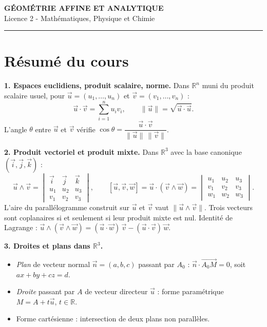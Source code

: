 \documentclass[12pt,a4paper]{article}
\begin{document}
\fi

\begin{center}
  {\LARGE\bfseries GÉOMÉTRIE AFFINE ET ANALYTIQUE}\\[0.3cm]
  {\normalsize Licence 2 - Mathématiques, Physique et Chimie}\\[0.1cm]
  \rule{0.7\textwidth}{0.8pt}
\end{center}

\section*{Résumé du cours}

\begin{boiteresume}

\textbf{1. Espaces euclidiens, produit scalaire, norme.}
Dans $\mathbb{R}^n$ muni du produit scalaire usuel, pour $\vec{u} = (u_1, \ldots, u_n)$ et
$\vec{v} = (v_1, \ldots, v_n)$ :
\[
  \vec{u} \cdot \vec{v} = \sum_{i=1}^n u_i v_i, \qquad
  \|\vec{u}\| = \sqrt{\vec{u} \cdot \vec{u}}.
\]
L'angle $\theta$ entre $\vec{u}$ et $\vec{v}$ vérifie $\cos\theta = \dfrac{\vec{u}\cdot\vec{v}}{\|\vec{u}\|\,\|\vec{v}\|}$.

\textbf{2. Produit vectoriel et produit mixte.}
Dans $\mathbb{R}^3$ avec la base canonique $(\vec{i}, \vec{j}, \vec{k})$ :
\[
  \vec{u} \wedge \vec{v} =
  \begin{vmatrix} \vec{i} & \vec{j} & \vec{k} \\ u_1 & u_2 & u_3 \\ v_1 & v_2 & v_3 \end{vmatrix},
  \qquad
  [\vec{u}, \vec{v}, \vec{w}] = \vec{u} \cdot (\vec{v} \wedge \vec{w}) =
  \begin{vmatrix} u_1 & u_2 & u_3 \\ v_1 & v_2 & v_3 \\ w_1 & w_2 & w_3 \end{vmatrix}.
\]
L'aire du parallélogramme construit sur $\vec{u}$ et $\vec{v}$ vaut $\|\vec{u} \wedge \vec{v}\|$.
Trois vecteurs sont coplanaires si et seulement si leur produit mixte est nul.
Identité de Lagrange :
$\vec{u} \wedge (\vec{v} \wedge \vec{w}) = (\vec{u}\cdot\vec{w})\,\vec{v} - (\vec{u}\cdot\vec{v})\,\vec{w}$.

\textbf{3. Droites et plans dans $\mathbb{R}^3$.}
\begin{itemize}[nosep]
  \item \textit{Plan} de vecteur normal $\vec{n}=(a,b,c)$ passant par $A_0$ :
    $\vec{n}\cdot\overrightarrow{A_0 M}=0$, soit $ax+by+cz=d$.
  \item \textit{Droite} passant par $A$ de vecteur directeur $\vec{u}$ : forme paramétrique $M = A + t\vec{u}$,
    $t\in\mathbb{R}$.
  \item Forme cartésienne : intersection de deux plans non parallèles.
\end{itemize}


\end{boiteresume}
\end{document}
